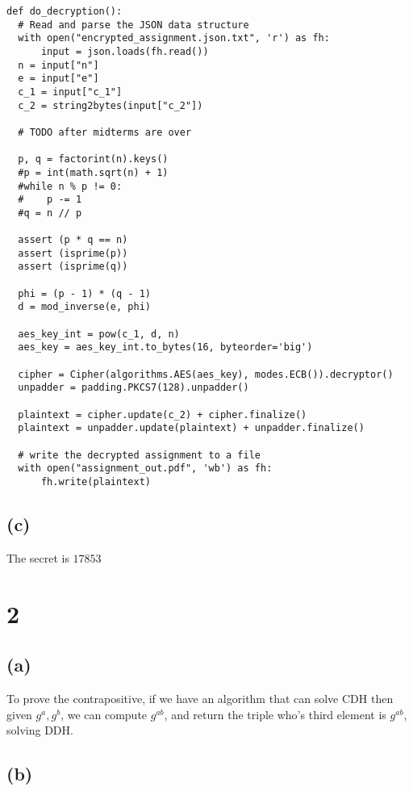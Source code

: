 \documentclass[11pt]{article}
\begin{document}
\begin{verbatim}
def do_decryption():
  # Read and parse the JSON data structure
  with open("encrypted_assignment.json.txt", 'r') as fh:
      input = json.loads(fh.read())
  n = input["n"]
  e = input["e"]
  c_1 = input["c_1"]
  c_2 = string2bytes(input["c_2"])

  # TODO after midterms are over

  p, q = factorint(n).keys()
  #p = int(math.sqrt(n) + 1)
  #while n % p != 0:
  #    p -= 1
  #q = n // p

  assert (p * q == n)
  assert (isprime(p))
  assert (isprime(q))

  phi = (p - 1) * (q - 1)
  d = mod_inverse(e, phi)

  aes_key_int = pow(c_1, d, n)
  aes_key = aes_key_int.to_bytes(16, byteorder='big')

  cipher = Cipher(algorithms.AES(aes_key), modes.ECB()).decryptor()
  unpadder = padding.PKCS7(128).unpadder()

  plaintext = cipher.update(c_2) + cipher.finalize()
  plaintext = unpadder.update(plaintext) + unpadder.finalize()

  # write the decrypted assignment to a file
  with open("assignment_out.pdf", 'wb') as fh:
      fh.write(plaintext)
\end{verbatim}

\subsection{(c)}

The secret is $17853$

\newpage

\section{2}

\subsection{(a)}

To prove the contrapositive, if we have an algorithm that can solve CDH then given $g^a, g^b$, we can compute $g^{ab}$, and return the triple who's third element is $g^{ab}$, solving DDH.

\subsection{(b)}
\end{document}
